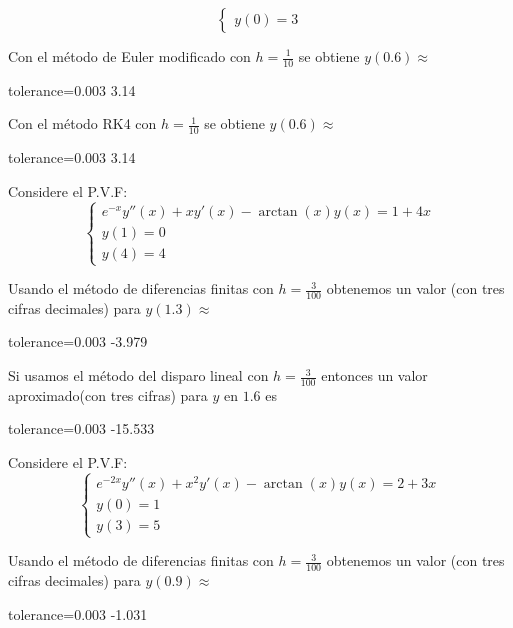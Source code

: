 \documentclass{article}
\begin{document}
\begin{quiz}{}
\begin{cloze}{}
\[\begin{cases}
    		y(0) = 3
    	\end{cases}
    	\]
    	\begin{numerical}[points=15]{}
    		Con el m\'etodo de Euler modificado con $h=\frac{1}{10}$ se obtiene $y(0.6)\approx$ \item[tolerance=0.003] 3.14
    	\end{numerical}
    	\begin{numerical}[points=18]{}
    		Con el m\'etodo RK4 con $h=\frac{1}{10}$ se obtiene $y(0.6)\approx$ \item[tolerance=0.003] 3.14
    	\end{numerical}
    \end{cloze}
    	\begin{cloze}{}
    		Considere el P.V.F:
    		\[\begin{cases}e^{-x}y''(x) + xy'(x) - \arctan(x)y(x) = 1+4x \\ 
    			y(1)=0\\ 
    			y(4) = 4
    		\end{cases}\]
    		\begin{numerical}[points=15]{}
    			Usando el m\'etodo de diferencias finitas con $h=\frac{3}{100}$ obtenemos un valor (con tres cifras decimales) para $y(1.3)\approx$\item[tolerance=0.003] -3.979
    		\end{numerical}
    	    \begin{numerical}[points=18]{}
    	    	Si usamos el m\'etodo del disparo lineal con $h=\frac{3}{100}$ entonces un valor aproximado(con tres cifras) para $y$ en $1.6$ es\item[tolerance=0.003] -15.533
    	    \end{numerical}
    	\end{cloze}
    \begin{cloze}{}
    	Considere el P.V.F:
    	\[
    	\begin{cases}
    		e^{-2x}y''(x) + x^2 y'(x) - \arctan(x)y(x) = 2 + 3x \\
    		y(0) = 1 \\
    		y(3) = 5
    	\end{cases}
    	\]
    	\begin{numerical}[points=15]{}
    		Usando el m\'etodo de diferencias finitas con $h=\frac{3}{100}$ obtenemos un valor (con tres cifras decimales) para $y(0.9)\approx$ \item[tolerance=0.003] -1.031
    	\end{numerical}
    	\begin{numerical}[points=18]{}

\end{numerical}
\end{cloze}
\end{quiz}
\end{document}
